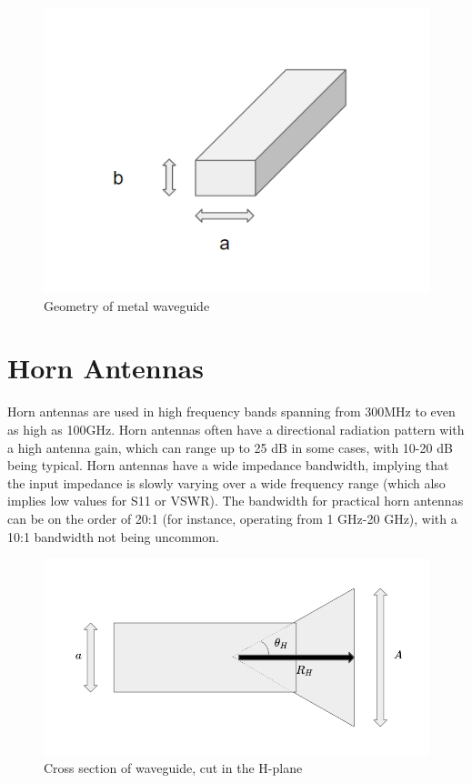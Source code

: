\documentclass[a4paper,12pt]{report}
\begin{document}
\begin{figure}
  \begin{center}
    \includegraphics[clip, keepaspectratio, width=0.5\linewidth]{img/metal_waveguide_with_dims.png}
    \caption{Geometry of metal waveguide}
    \label{fig:metal_waveguide_geometry}
  \end{center}
\end{figure}

\section{Horn Antennas}

Horn antennas are used in high frequency bands spanning from 300MHz
to even as high as 100GHz.
Horn antennas often have a directional radiation pattern with a high antenna gain,
which can range up to 25 dB in some cases, with 10-20 dB being typical.
Horn antennas have a wide impedance bandwidth,
implying that the input impedance is slowly varying over a wide frequency range (which also implies low values for S11 or VSWR). The bandwidth for practical horn antennas can be on the order of 20:1 (for instance, operating from 1 GHz-20 GHz),
with a 10:1 bandwidth not being uncommon.

\begin{figure}
  \begin{center}
    \includegraphics[clip, keepaspectratio, width=0.5\linewidth]{img/horn_antenna_h_plane_cross_section.png}
    \caption{Cross section of waveguide, cut in the H-plane}
    \label{fig:horn_antenna_h_plane_cross_section}
  \end{center}
\end{figure}
\end{document}

